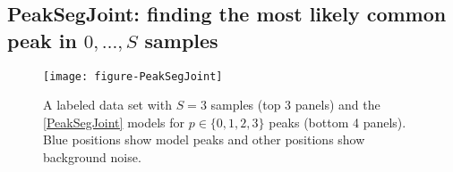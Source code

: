 \documentclass{article} %
\DeclareMathOperator*{\argmin}{arg\,min}
\begin{document}
  



\subsection{PeakSegJoint: finding the most likely common peak in
  $0,\dots, S$ samples}

\begin{figure}[b!]
  \centering
  \texttt{[image: figure-PeakSegJoint]}
  \vskip -0.5cm
  \caption{A labeled data set with $S=3$ samples (top 3 panels) and
    the \ref{PeakSegJoint} models for $p\in\{0, 1, 2, 3\}$ peaks
    (bottom 4 panels). Blue positions show model peaks and other positions 
    show background noise.
  }
  \label{fig:PeakSegJoint}
\end{figure}
\end{document}
